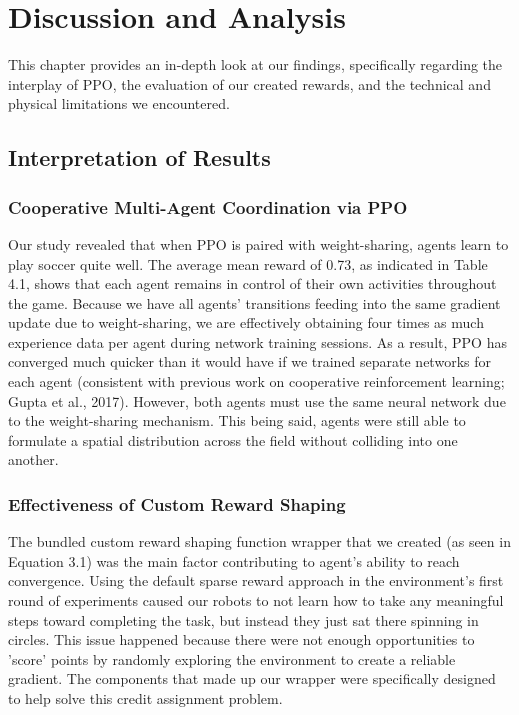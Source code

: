 \chapter{Discussion and Analysis}
\label{ch:evaluation}

This chapter provides an in-depth look at our findings, specifically regarding the interplay of
PPO, the evaluation of our created rewards, and the technical and physical limitations we
encountered.

\section{Interpretation of Results}
\label{sec:interpretation}

\subsection{Cooperative Multi-Agent Coordination via PPO}
\label{subsec:disc_ppo}

Our study revealed that when PPO is paired with weight-sharing, agents learn to play soccer quite well. The average mean reward of 0.73, as indicated in Table 4.1, shows that each agent remains in control of their own activities throughout the game.
Because we have all agents' transitions feeding into the same gradient update due to weight-sharing, we are effectively obtaining four times as much experience data per agent during network training sessions. As a result, PPO has converged much quicker than it would have if we trained separate networks for each agent (consistent with previous work on cooperative reinforcement learning; Gupta et al., 2017). However, both agents must use the same neural network due to the weight-sharing mechanism. This being said, agents were still able to formulate a spatial distribution across the field without colliding into one another.

\subsection{Effectiveness of Custom Reward Shaping}
\label{subsec:disc_reward_shaping}

The bundled custom reward shaping function wrapper that we created (as seen in Equation 3.1) was the main factor contributing to agent's ability to reach convergence. Using the default sparse reward approach in the environment's first round of experiments caused our robots to not learn how to take any meaningful steps toward completing the task, but instead they just sat there spinning in circles. This issue happened because there were not enough opportunities to 'score' points by randomly exploring the environment to create a reliable gradient. The components that made up our wrapper were specifically designed to help solve this credit assignment problem. 

